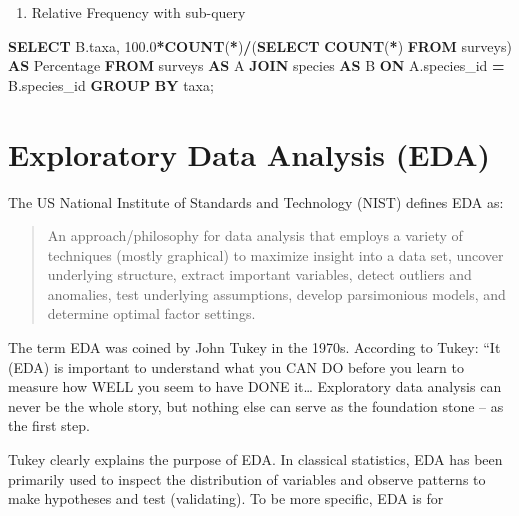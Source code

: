 \documentclass[
]{book}
\newenvironment{Shaded}{\begin{snugshade}}{\end{snugshade}}
\newcommand{\FloatTok}[1]{\textcolor[rgb]{0.00,0.00,0.81}{#1}}
\newcommand{\FunctionTok}[1]{\textcolor[rgb]{0.13,0.29,0.53}{\textbf{#1}}}
\newcommand{\KeywordTok}[1]{\textcolor[rgb]{0.13,0.29,0.53}{\textbf{#1}}}
\newcommand{\NormalTok}[1]{#1}
\newcommand{\OperatorTok}[1]{\textcolor[rgb]{0.81,0.36,0.00}{\textbf{#1}}}
\providecommand{\tightlist}{%
  \setlength{\itemsep}{0pt}\setlength{\parskip}{0pt}}
\begin{document}
\begin{enumerate}
\def\labelenumi{\arabic{enumi}.}
\setcounter{enumi}{1}
\tightlist
\item
  Relative Frequency with sub-query
\end{enumerate}

\begin{Shaded}
\begin{Highlighting}[]
\KeywordTok{SELECT}\NormalTok{ B.taxa, }
       \FloatTok{100.0}\OperatorTok{*}\FunctionTok{COUNT}\NormalTok{(}\OperatorTok{*}\NormalTok{)}\OperatorTok{/}\NormalTok{(}\KeywordTok{SELECT} \FunctionTok{COUNT}\NormalTok{(}\OperatorTok{*}\NormalTok{) }\KeywordTok{FROM}\NormalTok{ surveys)  }\KeywordTok{AS}\NormalTok{ Percentage}
\KeywordTok{FROM}\NormalTok{ surveys }\KeywordTok{AS}\NormalTok{ A}
\KeywordTok{JOIN}\NormalTok{ species }\KeywordTok{AS}\NormalTok{ B}
\KeywordTok{ON}\NormalTok{ A.species\_id }\OperatorTok{=}\NormalTok{ B.species\_id }
\KeywordTok{GROUP} \KeywordTok{BY}\NormalTok{ taxa;}
\end{Highlighting}
\end{Shaded}

\hfill\break

\hypertarget{exploratory-data-analysis-eda}{%
\chapter{Exploratory Data Analysis (EDA)}\label{exploratory-data-analysis-eda}}

The US National Institute of Standards and Technology (NIST) defines EDA as:

\begin{quote}
An approach/philosophy for data analysis that employs a variety of techniques (mostly graphical) to maximize insight into a data set, uncover underlying structure, extract important variables, detect outliers and anomalies, test underlying assumptions, develop parsimonious models, and determine optimal factor settings.
\end{quote}

The term EDA was coined by John Tukey in the 1970s. According to Tukey: ``It (EDA) is important to understand what you CAN DO before you learn to measure how WELL you seem to have DONE it\ldots{} Exploratory data analysis can never be the whole story, but nothing else can serve as the foundation stone -- as the first step.

Tukey clearly explains the purpose of EDA. In classical statistics, EDA has been primarily used to inspect the distribution of variables and observe patterns to make hypotheses and test (validating). To be more specific, EDA is for
\end{document}
